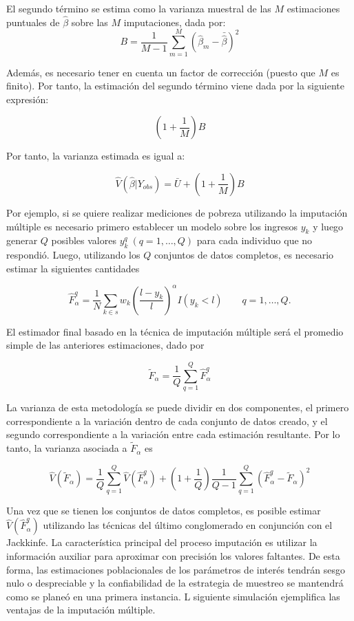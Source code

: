 \documentclass[
  12pt,
]{book}
\begin{document}
El segundo término se estima como la varianza muestral de las \(M\) estimaciones puntuales de \(\hat{\beta}\) sobre las \(M\) imputaciones, dada por:
\[
B = \frac{1}{M-1} \sum_{m = 1} ^ M (\hat{\beta}_m - \bar{\hat{\beta}})^2
\]

Además, es necesario tener en cuenta un factor de corrección (puesto que \(M\) es finito). Por tanto, la estimación del segundo término viene dada por la siguiente expresión:

\[
\left(1 + \frac{1}{M}\right) B
\]

Por tanto, la varianza estimada es igual a:

\[
\hat{V}(\hat{\beta} | Y_{obs}) = \bar{U} + \left(1 + \frac{1}{M}\right) B
\]

Por ejemplo, si se quiere realizar mediciones de pobreza utilizando la imputación múltiple es necesario primero establecer un modelo sobre los ingresos \(y_k\) y luego generar \(Q\) posibles valores \(y_k^q \ (q=1, \ldots, Q)\) para cada individuo que no respondió. Luego, utilizando los \(Q\) conjuntos de datos completos, es necesario estimar la siguientes cantidades

\[
\hat{F}_{\alpha}^{q}=\frac{1}{N}\sum_{k\in s} w_k 
\left(\frac{l-y_k}{l}\right)^{\alpha}I(y_k<l) \ \ \ \ \ \ \ \ \ 
q= 1,\ldots, Q.
\]

El estimador final basado en la técnica de imputación múltiple será el promedio simple de las anteriores estimaciones, dado por

\[
\tilde{F}_{\alpha}=\frac{1}{Q}\sum_{q=1}^Q \hat{F}_{\alpha}^{q}
\]

La varianza de esta metodología se puede dividir en dos componentes, el primero correspondiente a la variación dentro de cada conjunto de datos creado, y el segundo correspondiente a la variación entre cada estimación resultante. Por lo tanto, la varianza asociada a \(\tilde{F}_{\alpha}\) es

\[
\hat{V}(\tilde{F}_{\alpha})
= \frac{1}{Q}\sum_{q=1}^Q \hat{V}(\hat{F}_{\alpha}^{q})
+ \left(1+\frac{1}{Q}\right)\frac{1}{Q-1}\sum_{q=1}^Q (\hat{F}_{\alpha}^{q}-\tilde{F}_{\alpha})^2
\]

Una vez que se tienen los conjuntos de datos completos, es posible estimar \(\hat{V}(\hat{F}_{\alpha}^{q})\) utilizando las técnicas del último conglomerado en conjunción con el Jackkinfe. La característica principal del proceso imputación es utilizar la información auxiliar para aproximar con precisión los valores faltantes. De esta forma, las estimaciones poblacionales de los parámetros de interés tendrán sesgo nulo o despreciable y la confiabilidad de la estrategia de muestreo se mantendrá como se planeó en una primera instancia. L siguiente simulación ejemplifica las ventajas de la imputación múltiple.
\end{document}
